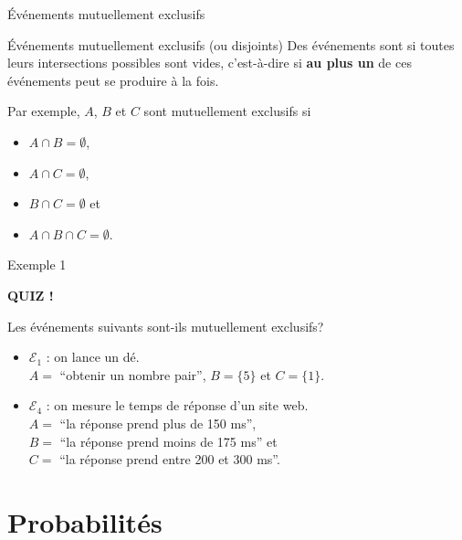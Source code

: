 \documentclass{BeamerTemplate}
\newcommand{\cibleReponse}{}
\newcommand{\lienreponse}[1]{\gdef\cibleReponse{#1}}
\begin{document}
\begin{frame}{Événements mutuellement exclusifs}
 \begin{Boite}{Événements mutuellement exclusifs (ou disjoints)}
  Des événements sont  si toutes leurs
  intersections possibles sont vides, c'est-à-dire si \textbf{au plus un}
  de ces événements peut se produire à la fois.
 \end{Boite}

 \medskip

\pause


 Par exemple, $A$, $B$ et $C$ sont mutuellement exclusifs si

  \begin{itemize}
   \item $A\cap B=\emptyset$,
   \item $A\cap C=\emptyset$,
   \item $B\cap C=\emptyset$ et
   \item $A\cap B\cap C=\emptyset$.
 \end{itemize}

\end{frame}

\begin{frame}[t,label=ex1]{Exemple 1}

\centerline{\LARGE\bfseries\alert{QUIZ !}}
 Les événements suivants sont-ils mutuellement exclusifs?
 \medskip

 {\small
  \begin{itemize}\itemsep1.3cm
   \item $\mathcal{E}_1$ : on lance un dé.\\
   $A=$ \enquote{obtenir un nombre pair}, $B=\{5\}$ et $C=\{1\}$.
   \item $\mathcal{E}_4$ : on mesure le temps de réponse d'un site web.\\
   $A=$ \enquote{la réponse prend plus de 150 ms},\\
   $B=$ \enquote{la réponse prend moins de 175 ms} et\\
   $C=$ \enquote{la réponse prend entre 200 et 300 ms}.
   \vspace{1.3cm}
 \end{itemize}
 }
\lienreponse{rep-quiz}
\end{frame}


\section{Probabilités}
\end{document}
